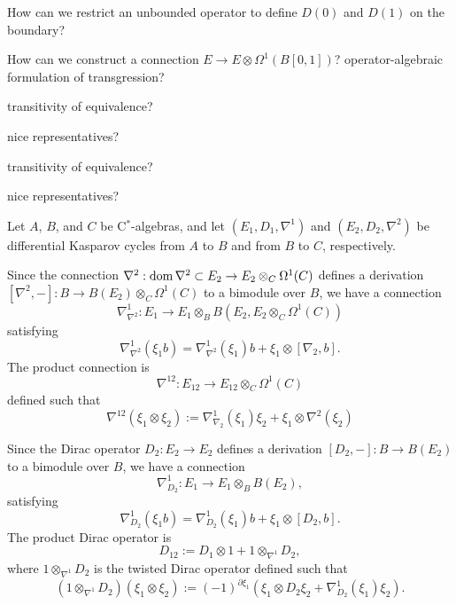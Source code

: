 \documentclass{../../large}
\begin{document}
\begin{prb}
How can we restrict an unbounded operator to define $D(0)$ and $D(1)$ on the boundary?

How can we construct a connection $E\to E\otimes\Omega^1(B[0,1])$?
operator-algebraic formulation of transgression?
\begin{parts}
\item transitivity of equivalence?
\item nice representatives?
\end{parts}
\end{prb}

\begin{prb}

\begin{parts}
\item transitivity of equivalence?
\item nice representatives?
\end{parts}
\end{prb}

\begin{prb}
Let $A$, $B$, and $C$ be C$^*$-algebras, and let $(E_1,D_1,\nabla^1)$ and $(E_2,D_2,\nabla^2)$ be differential Kasparov cycles from $A$ to $B$ and from $B$ to $C$, respectively.

Since the connection $\nabla^2:\operatorname{dom}\nabla^2\subset E_2\to E_2\otimes_C\Omega^1(C)$ defines a derivation $[\nabla^2,-]:B\to B(E_2)\otimes_C\Omega^1(C)$ to a bimodule over $B$, we have a connection
\[\nabla^1_{\nabla^2}:E_1\to E_1\otimes_BB(E_2,E_2\otimes_C\Omega^1(C))\]
satisfying
\[\nabla^1_{\nabla^2}(\xi_1b)=\nabla^1_{\nabla^2}(\xi_1)b+\xi_1\otimes[\nabla_2,b].\]
The product connection is
\[\nabla^{12}:E_{12}\to E_{12}\otimes_C\Omega^1(C)\]
defined such that
\[\nabla^{12}(\xi_1\otimes\xi_2):=\nabla^1_{\nabla_2}(\xi_1)\xi_2+\xi_1\otimes\nabla^2(\xi_2)\]

Since the Dirac operator $D_2:E_2\to E_2$ defines a derivation $[D_2,-]:B\to B(E_2)$ to a bimodule over $B$, we have a connection
\[\nabla^1_{D_2}:E_1\to E_1\otimes_BB(E_2),\]
satisfying
\[\nabla^1_{D_2}(\xi_1b)=\nabla^1_{D_2}(\xi_1)b+\xi_1\otimes[D_2,b].\]
The product Dirac operator is
\[D_{12}:=D_1\otimes1+1\otimes_{\nabla^1}D_2,\]
where $1\otimes_{\nabla^1}D_2$ is the twisted Dirac operator defined such that
\[(1\otimes_{\nabla^1}D_2)(\xi_1\otimes\xi_2):=(-1)^{\partial\xi_1}(\xi_1\otimes D_2\xi_2+\nabla^1_{D_2}(\xi_1)\xi_2).\]

\end{prb}
\end{document}
